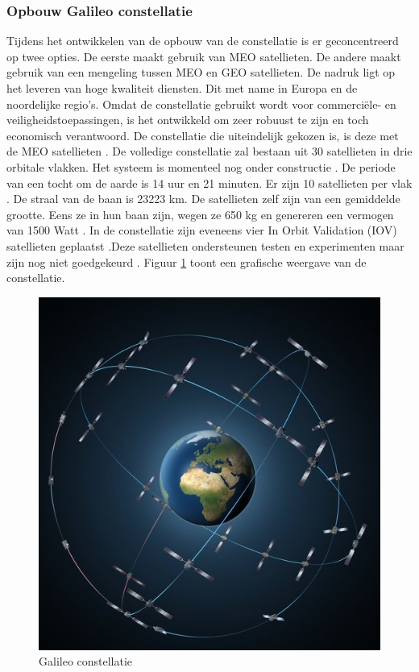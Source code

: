 \subsubsection{Opbouw Galileo constellatie}
Tijdens het ontwikkelen van de opbouw van de constellatie is er geconcentreerd op twee opties. De eerste maakt gebruik van MEO satellieten. De andere maakt gebruik van een mengeling tussen MEO en GEO satellieten. De nadruk ligt op het leveren van hoge kwaliteit diensten. Dit met name in Europa en de noordelijke regio's. Omdat de constellatie gebruikt wordt voor commerci\"ele- en veiligheidstoepassingen, is het ontwikkeld om zeer robuust te zijn en toch economisch verantwoord. De constellatie die uiteindelijk gekozen is, is deze met de MEO satellieten \cite{LBibGalileo2}. De volledige constellatie zal bestaan uit 30 satellieten in drie orbitale vlakken. Het systeem is momenteel nog onder constructie \cite{LBibGNSS4}. De periode van een tocht om de aarde is 14 uur en 21 minuten. Er zijn 10 satellieten per vlak \cite{LBibGNSS6}. De straal van de baan is 23223 km. De satellieten zelf zijn van een gemiddelde grootte. Eens ze in hun baan zijn, wegen ze 650 kg en genereren een vermogen van 1500 Watt \cite{LBibGalileo2}. In de constellatie zijn eveneens vier In Orbit Validation (IOV) satellieten geplaatst \cite{LBibBeiDou3,LBibPPP2}.Deze satellieten ondersteunen testen en experimenten maar zijn nog niet goedgekeurd \cite{LBibGNSS9}. Figuur \ref{imgGalileo} toont een grafische weergave van de constellatie.

\begin{figure}[h!]
	\includegraphics[scale=1.75]{Galileo.jpg}
	\centering
	\caption{Galileo constellatie \cite{LImgGalileo}}
	\label{imgGalileo}
\end{figure} 

